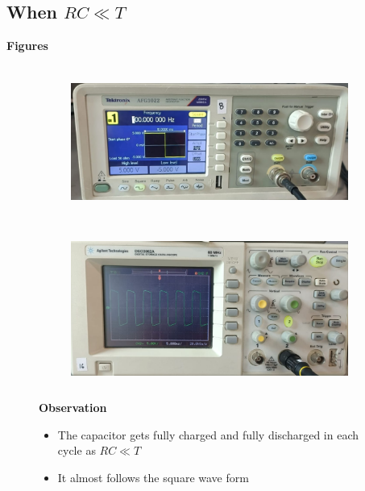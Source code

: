 \documentclass[a4paper,12pt]{article}
\begin{document}
\subsection{When $RC\ll T$}
\begin{itemize}
    \item \textbf{Figures}
    \begin{figure}[H]
    \centering
    \begin{subfigure}{0.48\textwidth}
        \centering
        \includegraphics[height=5cm]{figs/inputrc<<t.jpeg}
    \end{subfigure}
    \hspace{0.04\textwidth} %
    \begin{subfigure}{0.48\textwidth}
        \centering
        \includegraphics[height=5cm]{figs/outputrc<<t.jpeg}
    \end{subfigure}
    \item \textbf{Observation}
    \begin{itemize}
        \item The capacitor gets fully charged and fully discharged in each cycle as $RC\ll T$
        \item It almost follows the square wave form
    \end{itemize}
\end{figure}
\end{itemize}
\newpage
\end{document}
